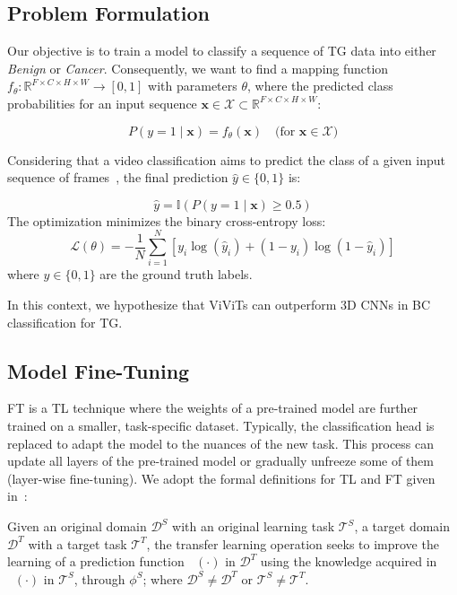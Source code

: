 \documentclass[runningheads]{llncs}
\DeclareMathOperator{\ypredtarget}{\phi^{T}}
\DeclareMathOperator{\ypredsource}{\phi^{S}}
\begin{document}
\subsection{Problem Formulation}
\label{sec:problem-formulation}

Our objective is to train a model to classify a sequence of \ac{TG}
data into either \textit{Benign} or \textit{Cancer}. Consequently, we
want to find a mapping function
$f_{\theta}: \mathbb{R}^{F \times C \times H \times W} \to [0,1]$
with parameters $\theta$, where the predicted class probabilities for
an input sequence
$\mathbf{x} \in \mathcal{X} \subset \mathbb{R}^{F \times C \times H
  \times W}$:

\begin{equation}
    P(y = 1 \mid \mathbf{x}) = f_\theta(\mathbf{x}) \quad \text{(for $\mathbf{x} \in \mathcal{X}$)}
\end{equation}

Considering that a video classification aims to predict the class of a
given input sequence of frames~\cite{Selva_2023}, the final prediction
$\hat{y} \in \{0,1\}$ is:

\begin{equation}
    \hat{y} = \mathbb{I}\left( P(y = 1 \mid \mathbf{x}) \geq 0.5 \right)
\end{equation}
The optimization  minimizes the binary cross-entropy loss:
\begin{equation}
    \mathcal{L}(\theta) = -\frac{1}{N}\sum_{i=1}^N \left[y_i\log(\hat{y}_i) + (1-y_i)\log(1-\hat{y}_i)\right]
\end{equation}
where $y \in \{0,1\}$ are the ground truth labels.

In this context, we hypothesize that  \ac{ViViTs} can outperform
3D \ac{CNNs} in \ac{BC} classification for \ac{TG}.


\subsection{Model Fine-Tuning}\label{sec:transfer-learnin}
\ac{FT} is a \ac{TL} technique where the weights of a pre-trained model are further trained on a smaller, task-specific dataset. Typically, the classification head is replaced to adapt the model to the nuances of the new task. This process can update all layers of the pre-trained model or gradually unfreeze some of them (layer-wise fine-tuning). We adopt the formal definitions for \ac{TL} and \ac{FT} given in~\cite{falconi2020transfer}:

\begin{definition}
  Given an original domain $\mathcal{D}^{S}$ with an original learning task $\mathcal{T}^{S}$, a target domain $\mathcal{D}^{T}$ with a target task $\mathcal{T}^{T}$, the transfer learning operation seeks to improve the learning of a prediction function $\ypredtarget(\cdot)$ in $\mathcal{D}^{T}$ using the knowledge acquired in $\ypredsource(\cdot)$ in $\mathcal{T}^{S}$, through $\phi^S$; where $\mathcal{D}^{S} \neq \mathcal{D}^{T}$ or $\mathcal{T}^{S} \neq \mathcal{T}^{T}$.
\end{definition}
\end{document}
